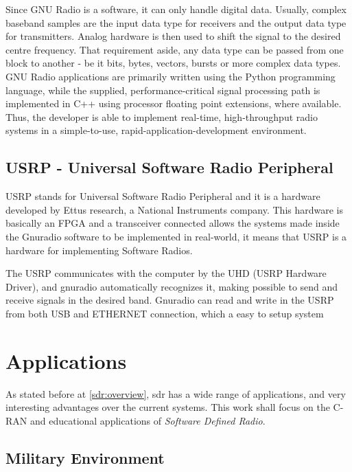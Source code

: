 Since GNU Radio is a software, it can only handle digital data. Usually, complex
baseband samples are the input data type for receivers and the output data type
for transmitters. Analog hardware is then used to shift the signal to the
desired centre frequency. That requirement aside, any data type can be passed
from one block to another - be it bits, bytes, vectors, bursts or more complex
data types.\\

GNU Radio applications are primarily written using the Python programming
language, while the supplied, performance-critical signal processing path is
implemented in C++ using processor floating point extensions, where available.
Thus, the developer is able to implement real-time, high-throughput radio
systems in a simple-to-use, rapid-application-development environment.\\

\subsection{USRP - Universal Software Radio Peripheral}

USRP stands for Universal Software Radio Peripheral and it is a hardware
developed by Ettus research, a National Instruments company. This hardware is
basically an FPGA and a transceiver connected allows the systems made inside the
Gnuradio software to be implemented in real-world, it means that USRP is a
hardware for implementing Software Radios.

The USRP communicates with the computer by the UHD (USRP Hardware Driver), and
gnuradio automatically recognizes it, making possible to send and receive
signals in the desired band. Gnuradio can read and write in the USRP from both
USB and ETHERNET connection, which a easy to setup system


\section{Applications}
\label{sec:sdr_app}

As stated before  at \ref{sdr:overview}, sdr has a wide range of applications,
and very interesting advantages over the current systems. This work shall focus
on the C-RAN and educational applications of \emph{Software Defined Radio}.

\subsection{Military Environment}


